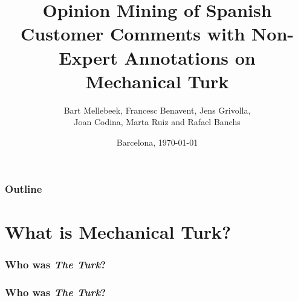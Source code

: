 \documentclass[10pt]{beamer}
\title{Opinion Mining of Spanish Customer Comments with Non-Expert Annotations on\\ Mechanical Turk}
\author{Bart Mellebeek, Francesc Benavent, Jens Grivolla,\\ Joan Codina, Marta Ruiz and Rafael Banchs}
\institute
{
  Barcelona Media Centre d'Innovacio\\ \vspace{.2cm}
  \pgfuseimage{bmlogo}
}
\date{Barcelona, \today}
\begin{document}
\frame{\titlepage}

\begin{frame}
  \frametitle{Outline}
  \tableofcontents
\end{frame}

\section{What is Mechanical Turk?}

\begin{frame}
  \frametitle{Who was \textit{The Turk}?}
  \begin{center}
  \end{center}
\end{frame}

\begin{frame}
  \frametitle{Who was \textit{The Turk}?}
  \begin{center}
  \end{center}
\end{frame}
\end{document}
